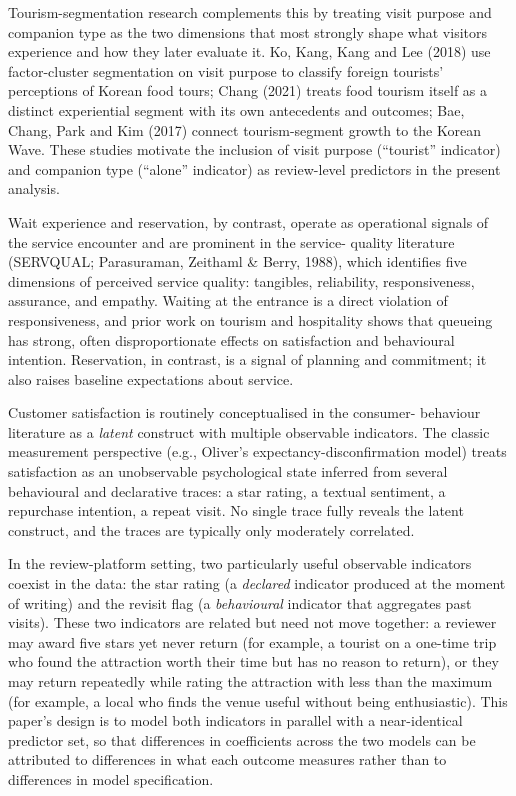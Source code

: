 \documentclass[10pt,a4paper]{article}
\newcommand{\subsect}[1]{\vspace{6pt}\noindent{\large\bfseries #1}\par\vspace{2pt}}
\begin{document}
Tourism-segmentation research complements this by treating visit
purpose and companion type as the two dimensions that most strongly
shape what visitors experience and how they later evaluate it. Ko,
Kang, Kang and Lee (2018) use factor-cluster segmentation on visit
purpose to classify foreign tourists' perceptions of Korean food tours;
Chang (2021) treats food tourism itself as a distinct experiential
segment with its own antecedents and outcomes; Bae, Chang, Park and
Kim (2017) connect tourism-segment growth to the Korean Wave. These
studies motivate the inclusion of visit purpose (``tourist'' indicator)
and companion type (``alone'' indicator) as review-level predictors in
the present analysis.

Wait experience and reservation, by contrast, operate as operational
signals of the service encounter and are prominent in the service-
quality literature (SERVQUAL; Parasuraman, Zeithaml \& Berry, 1988),
which identifies five dimensions of perceived service quality:
tangibles, reliability, responsiveness, assurance, and empathy. Waiting
at the entrance is a direct violation of responsiveness, and prior work
on tourism and hospitality shows that queueing has strong, often
disproportionate effects on satisfaction and behavioural intention.
Reservation, in contrast, is a signal of planning and commitment; it
also raises baseline expectations about service.

\subsect{2.2 Satisfaction as a Latent Construct}
Customer satisfaction is routinely conceptualised in the consumer-
behaviour literature as a \emph{latent} construct with multiple
observable indicators. The classic measurement perspective
(e.g., Oliver's expectancy-disconfirmation model) treats satisfaction
as an unobservable psychological state inferred from several behavioural
and declarative traces: a star rating, a textual sentiment, a repurchase
intention, a repeat visit. No single trace fully reveals the latent
construct, and the traces are typically only moderately correlated.

In the review-platform setting, two particularly useful observable
indicators coexist in the data: the star rating (a \emph{declared}
indicator produced at the moment of writing) and the revisit flag
(a \emph{behavioural} indicator that aggregates past visits). These
two indicators are related but need not move together: a reviewer may
award five stars yet never return (for example, a tourist on a one-time
trip who found the attraction worth their time but has no reason to
return), or they may return repeatedly while rating the attraction with
less than the maximum (for example, a local who finds the venue useful
without being enthusiastic). This paper's design is to model both
indicators in parallel with a near-identical predictor set, so that
differences in coefficients across the two models can be attributed to
differences in what each outcome measures rather than to differences in
model specification.
\end{document}
